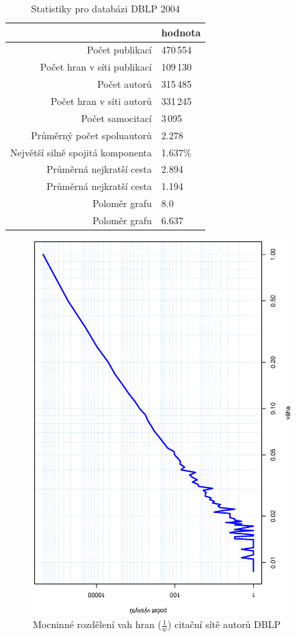 \documentclass{bakalarka}
\begin{document}
\begin{table}[!ht]
\centering
\caption{Statistiky pro databázi DBLP 2004}
\label{tab:dblpstat}
\begin{tabular}{r|l}
\toprule
& hodnota \\
\midrule
Počet publikací & 470\,554 \\
Počet hran v síti publikací & 109\,130 \\
Počet autorů & 315\,485 \\
Počet hran v síti autorů & 331\,245 \\
Počet samocitací & 3\,095 \\
Průměrný počet spoluautorů & 2.278 \\
Největší silně spojitá komponenta & 1.637\% \\
Průměrná nejkratší cesta\footnotemark[1] & 2.894 \\
Průměrná nejkratší cesta\footnotemark[2] & 1.194 \\
Poloměr grafu\footnotemark[1] & 8.0 \\
Poloměr grafu\footnotemark[2] & 6.637 \\
\bottomrule
\end{tabular}
\end{table}

\begin{figure}[!ht]
\centering
	\includegraphics[width=10cm,angle=270]{ewd_dblp.eps}
	\caption{Mocninné rozdělení vah hran ($\frac{1}{w}$) citační sítě autorů DBLP}
	\label{fig:scalefreedblp}
\end{figure}
\end{document}
